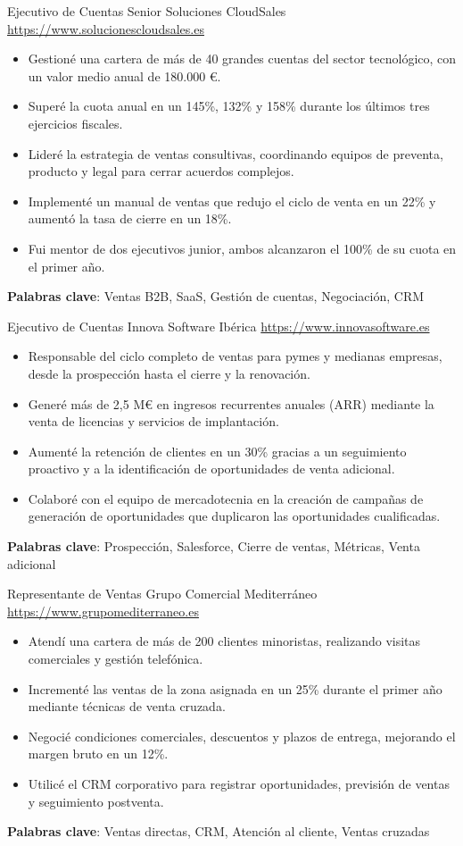 \documentclass[a4paper, serif, 10pt]{moderncv}
\begin{document}
        {Ejecutivo de Cuentas Senior}
        {Soluciones CloudSales}
        {\url{https://www.solucionescloudsales.es}}
        {}
        {\begin{itemize}
\item Gestioné una cartera de más de 40 grandes cuentas del sector tecnológico, con un valor medio anual de 180.000 €.
\item Superé la cuota anual en un 145\%, 132\% y 158\% durante los últimos tres ejercicios fiscales.
\item Lideré la estrategia de ventas consultivas, coordinando equipos de preventa, producto y legal para cerrar acuerdos complejos.
\item Implementé un manual de ventas que redujo el ciclo de venta en un 22\% y aumentó la tasa de cierre en un 18\%.
\item Fui mentor de dos ejecutivos junior, ambos alcanzaron el 100\% de su cuota en el primer año.
\end{itemize}
\textbf{Palabras clave}: Ventas B2B, SaaS, Gestión de cuentas, Negociación, CRM}

        {Ejecutivo de Cuentas}
        {Innova Software Ibérica}
        {\url{https://www.innovasoftware.es}}
        {}
        {\begin{itemize}
\item Responsable del ciclo completo de ventas para pymes y medianas empresas, desde la prospección hasta el cierre y la renovación.
\item Generé más de 2,5 M€ en ingresos recurrentes anuales (ARR) mediante la venta de licencias y servicios de implantación.
\item Aumenté la retención de clientes en un 30\% gracias a un seguimiento proactivo y a la identificación de oportunidades de venta adicional.
\item Colaboré con el equipo de mercadotecnia en la creación de campañas de generación de oportunidades que duplicaron las oportunidades cualificadas.
\end{itemize}
\textbf{Palabras clave}: Prospección, Salesforce, Cierre de ventas, Métricas, Venta adicional}

        {Representante de Ventas}
        {Grupo Comercial Mediterráneo}
        {\url{https://www.grupomediterraneo.es}}
        {}
        {\begin{itemize}
\item Atendí una cartera de más de 200 clientes minoristas, realizando visitas comerciales y gestión telefónica.
\item Incrementé las ventas de la zona asignada en un 25\% durante el primer año mediante técnicas de venta cruzada.
\item Negocié condiciones comerciales, descuentos y plazos de entrega, mejorando el margen bruto en un 12\%.
\item Utilicé el CRM corporativo para registrar oportunidades, previsión de ventas y seguimiento postventa.
\end{itemize}
\textbf{Palabras clave}: Ventas directas, CRM, Atención al cliente, Ventas cruzadas}
\end{document}
